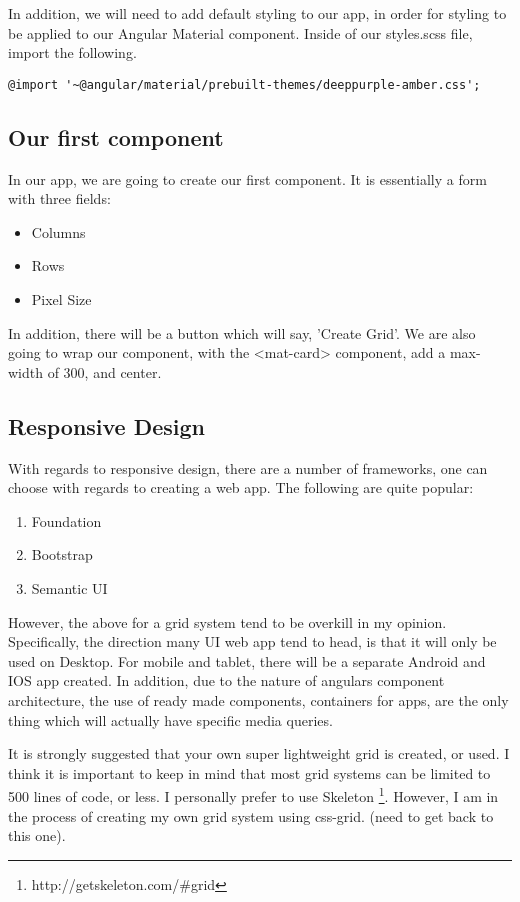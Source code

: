 In addition, we will need to add default styling to our app, in order for
styling to be applied to our Angular Material component. Inside of our
styles.scss file, import the following.
\begin{verbatim}
@import '~@angular/material/prebuilt-themes/deeppurple-amber.css';
\end{verbatim}

\subsection{ Our first component }
In our app, we are going to create our first component. It is essentially a form
with three fields:
\begin{itemize}
  \item Columns
  \item Rows
  \item Pixel Size
\end{itemize}

In addition, there will be a button which will say, 'Create Grid'. We are also
going to wrap our component, with the <mat-card> component, add a max-width of
300, and center.


\subsection{ Responsive Design }
With regards to responsive design, there are a number of frameworks, one can
choose with regards to creating a web app. The following are quite popular:
\begin{enumerate}
  \item Foundation
  \item Bootstrap
  \item Semantic UI
\end{enumerate}

However, the above for a grid system tend to be overkill in my opinion.
Specifically, the direction many UI web app tend to head, is that it will only
be used on Desktop. For mobile and tablet, there will be a separate Android and
IOS app created. In addition, due to the nature of angulars component
architecture, the use of ready made components, containers for apps, are the
only thing which will actually have specific media queries.

It is strongly suggested that your own super lightweight grid is created, or
used. I think it is important to keep in mind that most grid systems can be
limited to 500 lines of code, or less. I personally prefer to use Skeleton
\footnote{http://getskeleton.com/\#grid}. However, I am in the process of
creating my own grid system using css-grid. (need to get back to this one).
